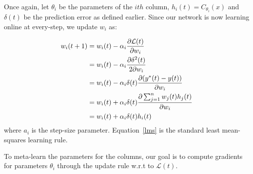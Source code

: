 \documentclass{article}
\begin{document}
Once again, let $\theta_i$ be the parameters of the $ith$ column, $h_i(t)=C_{\theta_i}(x)$ and $\delta(t)$ be the prediction error as defined earlier. Since our network is now learning online at every-step, we update $w_i$ as:

\begin{align}
    w_i(t+1) &= w_i(t) - \alpha_i \frac{\partial \mathcal L(t)}{\partial w_i} \notag \\
    &= w_i(t) - \alpha_i \frac{\partial \delta^2(t) }{2\partial w_i} \notag \\
    &= w_i(t) - \alpha_i \delta(t) \frac{\partial (y^*(t) - y(t)) }{\partial w_i} \notag \\
    &= w_i(t) + \alpha_i \delta(t) \frac{\partial \sum_{j=1}^n w_j(t)h_j(t) }{\partial w_i} \notag  \\
     &= w_i(t) + \alpha_i \delta(t) h_i(t) \label{lms}
\end{align}
where $a_i$ is the step-size parameter. Equation~\ref{lms} is the standard least mean-squares learning rule. 

To meta-learn the parameters for the columns, our goal is to compute gradients for parameters $\theta_i$ through the update rule w.r.t to $\mathcal L(t)$.
\end{document}

